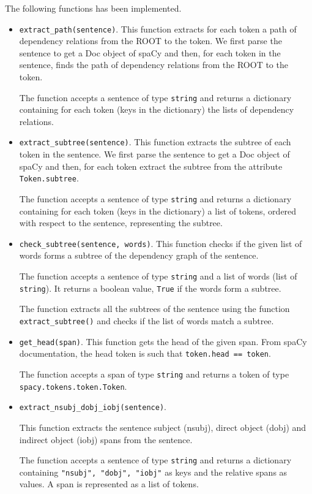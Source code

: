 \documentclass{article}
\begin{document}
The following functions has been implemented.
\begin{itemize}
    \item \texttt{extract\_path(sentence)}. This function extracts for each token a path of dependency relations from the 
    ROOT to the token. We first parse the sentence to get a Doc object of spaCy and then, for each token in the sentence,
    finds the path of dependency relations from the ROOT to the token.

    The function accepts a sentence of type \texttt{string} and returns a dictionary containing for each token (keys in the dictionary)
    the lists of dependency relations.

    \item \texttt{extract\_subtree(sentence)}. This function extracts the subtree of each token in the sentence. We first parse 
    the sentence to get a Doc object of spaCy and then, for each token extract the subtree from the attribute \texttt{Token.subtree}.

    The function accepts a sentence of type \texttt{string} and returns a dictionary containing for each token (keys in the dictionary)
    a list of tokens, ordered with respect to the sentence, representing the subtree.

    \item \texttt{check\_subtree(sentence, words)}. This function checks if the given list of words forms a subtree of the 
    dependency graph of the sentence.

    The function accepts a sentence of type \texttt{string} and a list of words (list of \texttt{string}). It returns a boolean value, 
    \texttt{True} if the words form a subtree.

    The function extracts all the subtrees of the sentence using the function \texttt{extract\_subtree()} and checks if the list of words
    match a subtree.

    \item \texttt{get\_head(span)}. This function gets the head of the given span. From spaCy documentation, the head token is such that
    \texttt{token.head == token}.

    The function accepts a span of type \texttt{string} and returns a token of type \texttt{spacy.tokens.token.Token}.

    \item \texttt{extract\_nsubj\_dobj\_iobj(sentence)}. 
    
    This function extracts the sentence subject (nsubj), direct object (dobj) and 
    indirect object (iobj) spans from the sentence.

    The function accepts a sentence of type \texttt{string} and returns a dictionary containing \texttt{"nsubj", "dobj", "iobj"} as keys 
    and the relative spans as values. A span is represented as a list of tokens.

    
\end{itemize}

\end{document}
